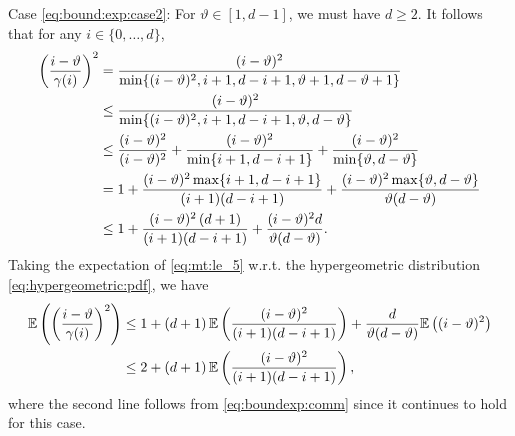 \documentclass[onecolumn,letterpaper]{IEEEtran}
\newcommand{\apn}{{\gamma}}
\newcommand{\cE}{{\mathbb{E}}}
\newcommand{\mnp}{{\vartheta}}
\newcommand{\idex}{{i}}
\begin{document}
Case \ref{eq:bound:exp:case2}: For $\mnp \in[1, d-1]$, we must have $d \ge 2$. It follows that for any $i\in \{0, \dots, d\}$,    
\begin{align}
    \left(\frac{\idex-\mnp}{\apn(\idex)}\right)^2  &= \frac{(\idex-\mnp)^2}{\min \{ (\idex - \mnp)^2, \idex+1, d-\idex+1, \mnp+1, d-\mnp+1 \}} \notag\\
    &\le \frac{(\idex-\mnp)^2}{\min \{ (\idex - \mnp)^2, \idex+1, d-\idex+1, \mnp, d-\mnp \}} \notag\\
    &\le \frac{(\idex-\mnp)^2}{(\idex - \mnp)^2} + \frac{(\idex-\mnp)^2}{\min \{ \idex+1, d-\idex+1 \}} + \frac{(\idex-\mnp)^2}{\min\{\mnp, d-\mnp\}} \notag\\
    &= 1 + \frac{(\idex-\mnp)^2 \max\{ \idex+1, d-\idex+1 \}}{(\idex+1)(d-\idex+1)}+ \frac{(\idex-\mnp)^2 \max\{\mnp, d-\mnp\}}{\mnp(d-\mnp)}  \notag\\
    &\le 1  + \frac{(\idex-\mnp)^2\left( d+1 \right)}{ (\idex+1) (d-\idex+1) } + \frac{(\idex-\mnp)^2 d}{\mnp(d-\mnp)}. \label{eq:mt:le_5}
\end{align}
Taking the expectation of \eqref{eq:mt:le_5} w.r.t. the hypergeometric distribution \eqref{eq:hypergeometric:pdf}, we have
\begin{align}
\label{eq:mt:le:exp}
    \cE \left(\left(\frac{\idex-\mnp}{\apn(\idex)}\right)^2\right) &\le 1 + \left( d+1 \right) \cE \left( \frac{(\idex-\mnp)^2}{(\idex+1)(d-\idex+1)} \right) + \frac{ d}{\mnp(d-\mnp)}\cE \left((\idex-\mnp)^2  \right) \notag\\
    &\leq 2 + \left( d+1 \right) \cE \left( \frac{(\idex-\mnp)^2}{(\idex+1)(d-\idex+1)} \right),
\end{align}
where the second line follows from \eqref{eq:boundexp:comm} since it continues to hold for this case. 
\end{document}
